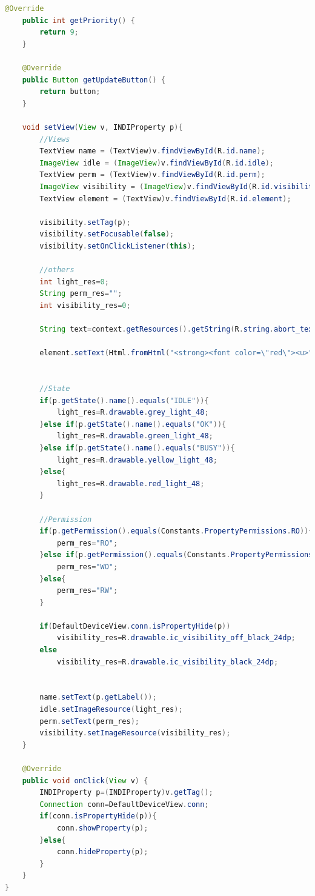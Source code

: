 \begin{lstlisting}[language=Java,caption={Clase manejadora de propiedades Abort},label={lst:abort_class}]
    @Override
    public int getPriority() {
        return 9;
    }

    @Override
    public Button getUpdateButton() {
        return button;
    }

    void setView(View v, INDIProperty p){
        //Views
        TextView name = (TextView)v.findViewById(R.id.name);
        ImageView idle = (ImageView)v.findViewById(R.id.idle);
        TextView perm = (TextView)v.findViewById(R.id.perm);
        ImageView visibility = (ImageView)v.findViewById(R.id.visibility);
        TextView element = (TextView)v.findViewById(R.id.element);

        visibility.setTag(p);
        visibility.setFocusable(false);
        visibility.setOnClickListener(this);

        //others
        int light_res=0;
        String perm_res="";
        int visibility_res=0;

        String text=context.getResources().getString(R.string.abort_text);

        element.setText(Html.fromHtml("<strong><font color=\"red\"><u>"+text+"</u></font></strong>"));


        //State
        if(p.getState().name().equals("IDLE")){
            light_res=R.drawable.grey_light_48;
        }else if(p.getState().name().equals("OK")){
            light_res=R.drawable.green_light_48;
        }else if(p.getState().name().equals("BUSY")){
            light_res=R.drawable.yellow_light_48;
        }else{
            light_res=R.drawable.red_light_48;
        }

        //Permission
        if(p.getPermission().equals(Constants.PropertyPermissions.RO)){
            perm_res="RO";
        }else if(p.getPermission().equals(Constants.PropertyPermissions.WO)){
            perm_res="WO";
        }else{
            perm_res="RW";
        }

        if(DefaultDeviceView.conn.isPropertyHide(p))
            visibility_res=R.drawable.ic_visibility_off_black_24dp;
        else
            visibility_res=R.drawable.ic_visibility_black_24dp;


        name.setText(p.getLabel());
        idle.setImageResource(light_res);
        perm.setText(perm_res);
        visibility.setImageResource(visibility_res);
    }

    @Override
    public void onClick(View v) {
        INDIProperty p=(INDIProperty)v.getTag();
        Connection conn=DefaultDeviceView.conn;
        if(conn.isPropertyHide(p)){
            conn.showProperty(p);
        }else{
            conn.hideProperty(p);
        }
    }
}

\end{lstlisting}

